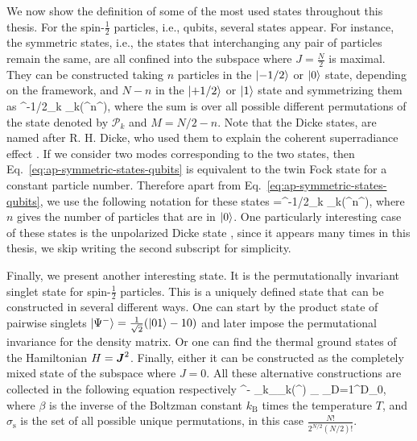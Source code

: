 We now show the definition of some of the most used states throughout this thesis.
For the spin-$\frac{1}{2}$ particles, i.e., qubits, several states appear.
For instance, the symmetric states, i.e., the states that interchanging any pair of particles remain the same, are all confined into the subspace where $J=\frac{N}{2}$ is maximal.
They can be constructed taking $n$ particles in the $\vert{-1/2}\rangle$ or $\vert{0}\rangle$ state, depending on the framework, and $N-n$ in the $\vert{+1/2}\rangle$ or $\vert{1}\rangle$ state and symmetrizing them as
\be
  \label{eq:ap-symmetric-states-qubits}
   \equiv {}^{-1/2}\sum_k _k(^{\otimes n}\otimes{}^{}),
\ee
where the sum is over all possible different permutations of the state denoted by $\mathcal{P}_k$ and $M=N/2-n$.
Note that the Dicke states, are named after R. H. Dicke, who used them to explain the coherent superradiance effect \cite{Dicke1954}.
If we consider two modes corresponding to the two states, then Eq.~\eqref{eq:ap-symmetric-states-qubits} is equivalent to the twin Fock state for a constant particle number.
Therefore apart from Eq.~\eqref{eq:ap-symmetric-states-qubits}, we use the following notation for these states
\be
   \equiv {}=^{-1/2}\sum_k _k(^{\otimes n}\otimes{}^{}),
  \label{eq:app-definition-of-dicke-states}
\ee
where $n$ gives the number of particles that are in $\vert{0}\rangle$.
One particularly interesting case of these states is the unpolarized Dicke state
\be
  \equiv {},
\ee
since it appears many times in this thesis, we skip writing the second subscript for simplicity.

Finally, we present another interesting state.
It is the permutationally invariant singlet state for spin-$\frac{1}{2}$ particles.
This is a uniquely defined state that can be constructed in several different ways.
One can start by the product state of pairwise singlets $\vert{\Psi^{-}}\rangle = \frac{1}{\sqrt{2}}(\vert{01}\rangle-{10})$ and later impose the permutational invariance for the density matrix.
Or one can find the thermal ground states of the Hamiltonian $H=\boldsymbol{J}^2$.
Finally, either it can be constructed as the completely mixed state of the subspace where $J=0$.
All these alternative constructions are collected in the following equation respectively
\be
  \lpar{}\rpar^{-} \sum_{k\in \sigma_{}}_k(\ketbra{\Psi^-}{\Psi^-}^{})
  \equiv
  \lim_{\beta\rightarrow\infty}
  \equiv
  \sum_{D=1}^{D_0},
\ee
where $\beta$ is the inverse of the Boltzman constant $k_\text{B}$ times the temperature $T$, and $\sigma_{\text{s}}$ is the set of all possible unique permutations, in this case $\frac{N!}{2^{N/2}(N/2)!}$.

